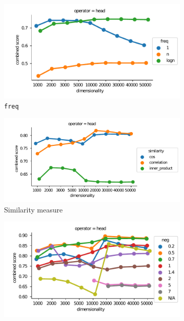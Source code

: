 \begin{figure}[b]
  \centering

  \begin{subfigure}[t]{0.49\textwidth}
  \includegraphics[width=\textwidth]{supplement/figures/single-interaction-freq}

  \caption{\texttt{freq}}
  \label{fig:single-similarity}
  \end{subfigure}
  \begin{subfigure}[t]{0.49\textwidth}

  \includegraphics[width=1.1\textwidth]{supplement/figures/single-interaction-similarity}

  \caption{Similarity measure}
  \label{fig:single-similarity}
  \end{subfigure}

  \begin{subfigure}[t]{0.49\textwidth}

  \includegraphics[width=\textwidth]{supplement/figures/single-interaction-neg}


\end{subfigure}
\end{figure}
